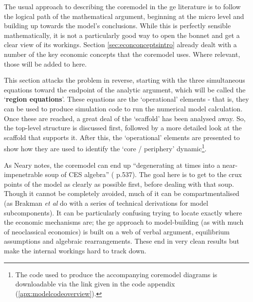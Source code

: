 The usual approach to describing the \gls{coremodel} in the \gls{ge} literature is to follow the logical path of the mathematical argument, beginning at the micro level and building up towards the model's conclusions. While this is perfectly sensible mathematically, it is not a particularly good way to open the bonnet and get a clear view of its workings. Section \ref{sec:econconceptsintro} already dealt with a number of the key economic concepts that the \gls{coremodel} uses. Where relevant, those will be added to here.

This section attacks the problem in reverse, starting with the three simultaneous equations toward the endpoint of the analytic argument, which will be called the `\textbf{region equations}'. These equations are the `operational' elements - that is, they can be used to produce simulation code to run the numerical model calculation. Once these are reached, a great deal of the `scaffold' has been analysed away. So, the top-level structure is discussed first, followed by a more detailed look at the scaffold that supports it. After this, the `operational' elements are presented to show how they are used to identify the `core / periphery' dynamic\footnote{The code used to produce the accompanying \gls{coremodel} diagrams is downloadable via the link given in the code appendix (\ref{apx:modelcodeoverview}).}.

As Neary notes, the \gls{coremodel} can end up ``degenerating at times into a near-impenetrable soup of CES algebra'' (\citealt{neary_hype_2001} p.537). The goal here is to get to the crux points of the model as clearly as possible first, before dealing with that soup. Though it cannot be completely avoided, much of it can be compartmentalised (as Brakman \emph{et al} do with a series of technical derivations for model subcomponents). It can be particularly confusing trying to locate exactly where the economic mechanisms are; the \gls{ge} approach to model-building (as with much of neoclassical economics) is built on a web of verbal argument, equilibrium assumptions and algebraic rearrangements. These end in very clean results but make the internal workings hard to track down.

